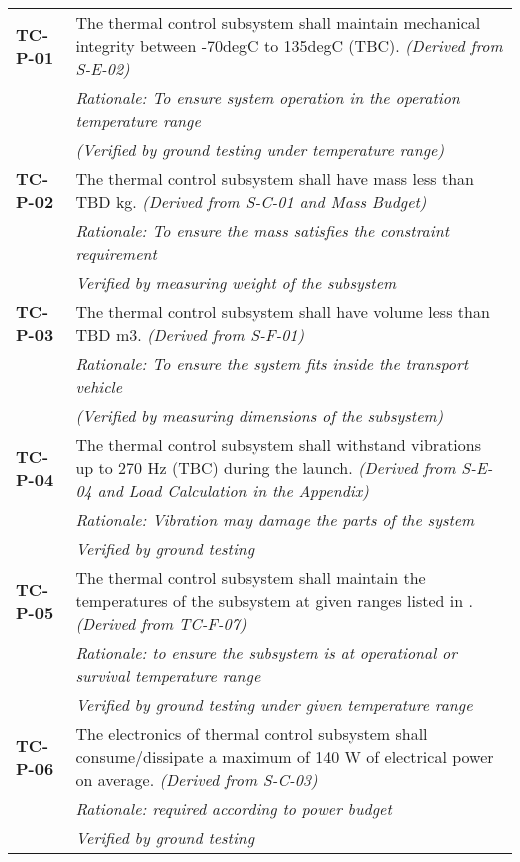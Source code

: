 \begin{longtable}{P{2cm}P{13.25cm}}

\textbf{TC-P-01}	&
The thermal control subsystem shall maintain mechanical integrity between -70\gls{degC} to 135\gls{degC} (\gls{TBC}).
\textit{(Derived from S-E-02)}	\\
& \textit{Rationale: To ensure system operation in the operation temperature range} \\
& \textit{(Verified by ground testing under temperature range)}	\\

\textbf{TC-P-02}	&
The thermal control subsystem shall have mass less than \gls{TBD} \gls{kg}.
\textit{(Derived from S-C-01 and Mass Budget)}	\\
& \textit{Rationale: To ensure the mass satisfies the constraint requirement} \\
& \textit{Verified by measuring weight of the subsystem}	\\

\textbf{TC-P-03}	&
The thermal control subsystem shall have volume less than \gls{TBD} \gls{m3}.
\textit{(Derived from S-F-01)}	\\
& \textit{Rationale: To ensure the system fits inside the transport vehicle} \\
& \textit{(Verified by measuring dimensions of the subsystem)}	\\

\textbf{TC-P-04}	&
The thermal control subsystem shall withstand vibrations up to 270 \gls{Hz} (\gls{TBC}) during the launch.
\textit{(Derived from S-E-04 and Load Calculation in the Appendix)}	\\
& \textit{Rationale: Vibration may damage the parts of the system} \\
& \textit{Verified by ground testing}	\\

\textbf{TC-P-05}	& The thermal control subsystem shall maintain the temperatures of the subsystem at given ranges listed in .
\textit{(Derived from TC-F-07)} \\
 & \textit{Rationale: to ensure the subsystem is at operational or survival temperature range} \\
 & \textit{Verified by ground testing under given temperature range}\\
 
\textbf{TC-P-06}	& The electronics of thermal control subsystem shall consume/dissipate a maximum of 140 \gls{W} of electrical power on average. 
\textit{(Derived from S-C-03)} \\
& \textit{Rationale: required according to power budget} \\
& \textit{Verified by ground testing}	\\


\end{longtable}
